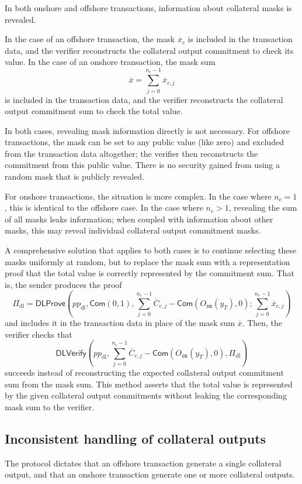 \documentclass{article}
\newcommand{\oon}{O_{\texttt{on}}}
\newcommand{\com}{\mathsf{Com}}
\begin{document}
In both onshore and offshore transactions, information about collateral masks is revealed.

In the case of an offshore transaction, the mask $\overline{x}_c$ is included in the transaction data, and the verifier reconstructs the collateral output commitment to check its value.
In the case of an onshore transaction, the mask sum
$$\overline{x} = \sum_{j=0}^{n_c-1} \overline{x}_{c,j}$$
is included in the transaction data, and the verifier reconstructs the collateral output commitment sum to check the total value.

In both cases, revealing mask information directly is not necessary.
For offshore transactions, the mask can be set to any public value (like zero) and excluded from the transaction data altogether; the verifier then reconstructs the commitment from this public value.
There is no security gained from using a random mask that is publicly revealed.

For onshore transactions, the situation is more complex.
In the case where $n_c = 1$, this is identical to the offshore case.
In the case where $n_c > 1$, revealing the sum of all masks leaks information; when coupled with information about other masks, this may reveal individual collateral output commitment masks.

A comprehensive solution that applies to both cases is to continue selecting these masks uniformly at random, but to replace the mask sum with a representation proof that the total value is correctly represented by the commitment sum.
That is, the sender produces the proof
$$\Pi_{\text{dl}} = \mathsf{DLProve}\left( pp_{\text{dl}}, \com(0,1), \sum_{j=0}^{n_c-1} \overline{C}_{c,j} - \com(\oon(y_T),0) ; \sum_{j=0}^{n_c-1} \overline{x}_{c,j} \right)$$
and includes it in the transaction data in place of the mask sum $\overline{x}$.
Then, the verifier checks that
$$\mathsf{DLVerify}\left( pp_{\text{dl}}, \sum_{j=0}^{n_c-1} \overline{C}_{c,j} - \com(\oon(y_T),0), \Pi_{\text{dl}} \right)$$
succeeds instead of reconstructing the expected collateral output commitment sum from the mask sum.
This method asserts that the total value is represented by the given collateral output commitments without leaking the corresponding mask sum to the verifier.


\subsection{Inconsistent handling of collateral outputs}

The protocol dictates that an offshore transaction generate a single collateral output, and that an onshore transaction generate one or more collateral outputs.
\end{document}

